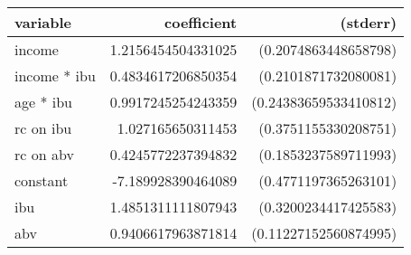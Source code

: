 \begin{tabular}{lrr}
\textbf{variable}&\textbf{coefficient}&\textbf{(stderr)}\\
\hline

income&1.2156454504331025&(0.2074863448658798)\\
income * ibu&0.4834617206850354&(0.2101871732080081)\\
age * ibu&0.9917245254243359&(0.24383659533410812)\\
rc on ibu&1.027165650311453&(0.3751155330208751)\\
rc on abv&0.4245772237394832&(0.1853237589711993)\\
constant&-7.189928390464089&(0.4771197365263101)\\
ibu&1.4851311111807943&(0.3200234417425583)\\
abv&0.9406617963871814&(0.11227152560874995)\\
\end{tabular}

